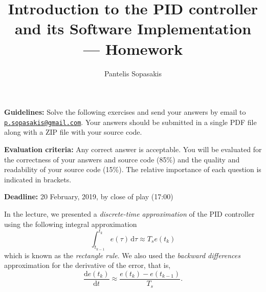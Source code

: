 \documentclass[a4paper,10pt,reqno]{amsart}
\title[PID Controller]{Introduction to the PID controller and its Software Implementation --- Homework}
\author[P. Sopasakis]{Pantelis Sopasakis}
\numberwithin{equation}{section}
\theoremstyle{plain}
\renewcommand{\d}{\mathrm{d}}
\begin{document}
\maketitle
\pagestyle{empty}

\noindent \textbf{Guidelines:} 
Solve the following exercises and send your answers by email to
\href{mailto:p.sopasakis@gmail.com}{\texttt{p.sopasakis@gmail.com}}.
Your answers should be submitted in a single PDF file along with a ZIP file with your source 
code.

\vspace{1em}

\noindent \textbf{Evaluation criteria:} Any correct answer is acceptable. You will be evaluated 
for the correctness of your answers and source code (85\%) and the quality and readability of 
your source code (15\%). The relative importance of each question is indicated in brackets.

\vspace{1em}

\noindent  \textbf{Deadline:} 20 February, 2019, by close of play (17:00)

\vspace{1em}
 In the lecture, we presented a \textit{discrete-time approximation} of the 
       PID controller using the following integral approximation
       \begin{equation}
        \int_{t_{k-1}}^{t_k} e(\tau)\, {}\mathrm{d}\tau {}\approx{} T_s e(t_k)\tag{1a}
       \end{equation}       
       which is known as the \textit{rectangle rule}. We also used the \textit{backward differences}
       approximation for the derivative of the error, that is,
       \[
        \frac{\d e(t_k)}{\d t} \approx \frac{e(t_k) - e(t_{k-1})}{T_s}\tag{1b}\label{eq:1b}.
       \]
\end{document}

